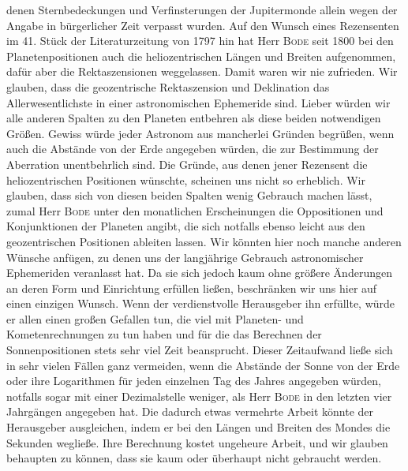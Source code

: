 denen Sternbedeckungen und Verfinsterungen der Jupitermonde allein wegen der Angabe in bürgerlicher Zeit verpasst wurden. Auf den Wunsch eines Rezensenten im 41. Stück der Literaturzeitung von 1797 hin hat Herr \textsc{Bode} seit 1800 bei den Planetenpositionen auch die heliozentrischen Längen und Breiten aufgenommen, dafür aber die Rektaszensionen weggelassen. Damit waren wir nie zufrieden. Wir glauben, dass die geozentrische Rektaszension und Deklination das Allerwesentlichste in einer astronomischen Ephemeride sind. Lieber würden wir alle anderen Spalten zu den Planeten entbehren als diese beiden notwendigen Größen. Gewiss würde jeder Astronom aus mancherlei Gründen begrüßen, wenn auch die Abstände von der Erde angegeben würden, die zur Bestimmung der Aberration unentbehrlich sind. Die Gründe, aus denen jener Rezensent die heliozentrischen Positionen wünschte, scheinen uns nicht so erheblich. Wir glauben, dass sich von diesen beiden Spalten wenig Gebrauch machen lässt, zumal Herr \textsc{Bode} unter den monatlichen Erscheinungen die Oppositionen und Konjunktionen der Planeten angibt, die sich notfalls ebenso leicht aus den geozentrischen Positionen ableiten lassen. Wir könnten hier noch manche anderen Wünsche anfügen, zu denen uns der langjährige Gebrauch astronomischer Ephemeriden veranlasst hat. Da sie sich jedoch kaum ohne größere Änderungen an deren Form und Einrichtung erfüllen ließen, beschränken wir uns hier auf einen einzigen Wunsch. Wenn der verdienstvolle Herausgeber ihn erfüllte, würde er allen einen großen Gefallen tun, die viel mit Planeten- und Kometenrechnungen zu tun haben und für die das Berechnen der Sonnenpositionen stets sehr viel Zeit beansprucht. Dieser Zeitaufwand ließe sich in sehr vielen Fällen ganz vermeiden, wenn die Abstände der Sonne von der Erde oder ihre Logarithmen für jeden einzelnen Tag des Jahres angegeben würden, notfalls sogar mit einer Dezimalstelle weniger, als Herr \textsc{Bode} in den letzten vier Jahrgängen angegeben hat. Die dadurch etwas vermehrte Arbeit könnte der Herausgeber ausgleichen, indem er bei den Längen und Breiten des Mondes die Sekunden wegließe. Ihre Berechnung kostet ungeheure Arbeit, und wir glauben behaupten zu können, dass sie kaum oder überhaupt nicht gebraucht werden.

